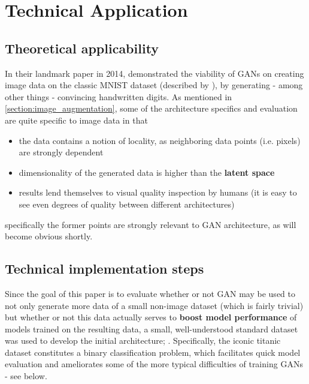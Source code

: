 \chapter{Technical Application}
\label{chapter:technical_application}

\section{Theoretical applicability}
\label{section:theory_application}

In their landmark paper in 2014, \cite{goodfellow2014generative} demonstrated the viability of \acp{GAN} on creating image data on the classic MNIST dataset (described by \cite{mnist}), by generating - among other things - convincing handwritten digits.
As mentioned in \ref{section:image_augmentation}, some of the architecture specifics and evaluation are quite specific to image data in that 

\begin{itemize}
	\item the data contains a notion of locality, as neighboring data points (i.e. pixels) are strongly dependent
	\item dimensionality of the generated data is higher than the \textbf{latent space} 
	\item results lend themselves to visual quality inspection by humans (it is easy to see even degrees of quality between different architectures)
\end{itemize}

specifically the former points are strongly relevant to \ac{GAN} architecture, as will become obvious shortly.

\section{Technical implementation steps}
\label{section:technical_implementation}

Since the goal of this paper is to evaluate whether or not \ac{GAN} may be used to not only generate more data of a small non-image dataset (which is fairly trivial) but whether or not this data actually serves to \textbf{boost model performance} of models trained on the resulting data, a small, well-understood standard dataset was used to develop the initial architecture; \cite{titanic}.
Specifically, the iconic titanic dataset constitutes a binary classification problem, which facilitates quick model evaluation and ameliorates some of the more typical difficulties of training \acp{GAN} - see below.

